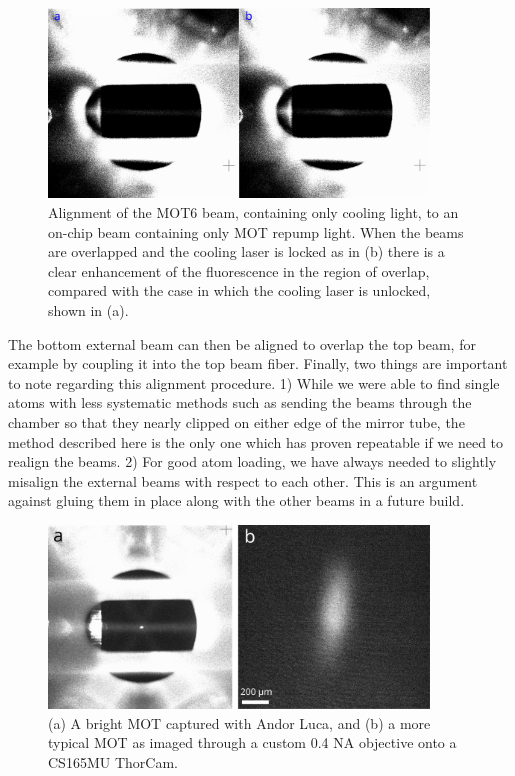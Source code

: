 \begin{figure}[!ht]
    \centering
    \includegraphics[width=0.9\textwidth]{Images/mot6_alignment_to_repump.pdf}
    \caption{Alignment of the MOT6 beam, containing only cooling 
    light, to an on-chip beam containing only MOT repump light. When the 
    beams are overlapped and the cooling laser is locked as in (b) there is a clear enhancement of the fluorescence in the region of overlap, compared with the case in which the cooling laser is unlocked, shown in (a).}
    \label{fig:external_beam_alignment}
\end{figure}
The bottom external beam can then be aligned to overlap the top beam, for example by coupling it into the top beam fiber. Finally, two things are important to note regarding this alignment procedure. 1) While we were able to find single atoms with less systematic methods such as sending the beams through the chamber so that they nearly clipped on either edge of the mirror tube, the method described here is the only one which has proven repeatable if we need to realign the beams. 2) For good atom loading, we have always needed to slightly misalign the external beams with respect to each other. This is an argument against gluing them in place along with the other beams in a future build.
\begin{figure}[!ht]
    \centering
    \includegraphics[width=0.9\textwidth]{Images/large_mot_and_thorcam_mot.pdf}
    \caption{(a) A bright MOT captured with Andor Luca, and (b) a more typical MOT 
    as imaged through a custom 0.4 NA objective onto a 
    CS165MU ThorCam.}
    \label{fig:large_mot_and_thorcam_mot}
\end{figure}
